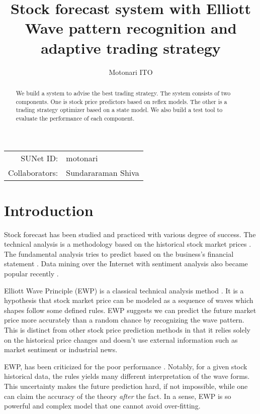 \documentclass[12pt]{article}
\begin{document}
\title{Stock forecast system with Elliott Wave pattern recognition and adaptive trading strategy}
\author{Motonari ITO}

\maketitle
\begin{center}
\begin{tabular}{rl}
SUNet ID: & motonari \\
Collaborators: & Sundararaman Shiva
\end{tabular}
\end{center}

\begin{abstract}
  We build a system to advise the best trading strategy. The system
  consists of two components. One is stock price predictors based on
  reflex models. The other is a trading strategy optimizer based on a
  state model. We also build a test tool to evaluate the performance
  of each component.
\end{abstract}

\section{Introduction}

Stock forecast has been studied and practiced with various degree of
success. The technical analysis is a methodology based on the
historical stock market prices \cite{wiki:technical_analysis}. The
fundamental analysis tries to predict based on the business's
financial statement \cite{wiki:fundamental_analysis}. Data mining over
the Internet with sentiment analysis also became popular recently
\cite{web:data_mining_analysis}.

Elliott Wave Principle (EWP) is a classical technical analysis method
\cite{frost1981elliott, web:study_of_cycles}. It is a hypothesis that stock market price
can be modeled as a sequence of waves which shapes follow some defined
rules. EWP suggests we can predict the future market price more
accurately than a random chance by recognizing the wave pattern.  This
is distinct from other stock price prediction methods in that it
relies solely on the historical price changes and doesn't use external
information such as market sentiment or industrial news. 

EWP, has been criticized for the poor performance
\cite{aronson2007evidence-based}. Notably, for a given stock
historical data, the rules yields many different interpretation of the
wave forms. This uncertainty makes the future prediction hard, if not
impossible, while one can claim the accuracy of the theory
\emph{after} the fact. In a sense, EWP is so powerful and complex
model that one cannot avoid over-fitting.
\end{document}
